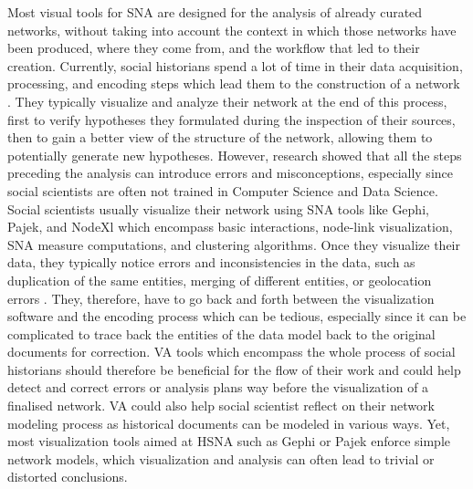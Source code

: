 Most visual tools for SNA are designed for the analysis of already curated networks, without taking into account the context in which those networks have been produced, where they come from, and the workflow that led to their creation.
Currently, social historians spend a lot of time in their data acquisition, processing, and encoding steps which lead them to the construction of a network \cite{lemercierBackSourcesPracticing2021}.
They typically visualize and analyze their network at the end of this process, first to verify hypotheses they formulated during the inspection of their sources, then to gain a better view of the structure of the network, allowing them to potentially generate new hypotheses\cite{dufournaudCommentRendreVisible2018}.
However, research showed that all the steps preceding the analysis can introduce errors and misconceptions, especially since social scientists are often not trained in Computer Science and Data Science\cite{lemercier12FormalNetwork2015, alkadi2022}.
Social scientists usually visualize their network using SNA tools like Gephi\cite{Gephi}, Pajek\cite{pajek}, and NodeXl\cite{noauthor_nodexl_nodate} which encompass basic interactions, node-link visualization, SNA measure computations, and clustering algorithms.
Once they visualize their data, they typically notice errors and inconsistencies in the data, such as duplication of the same entities, merging of different entities, or geolocation errors \cite{alkadi2022}.
They, therefore, have to go back and forth between the visualization software and the encoding process which can be tedious, especially since it can be complicated to trace back the entities of the data model back to the original documents for correction.
VA tools which encompass the whole process of social historians should therefore be beneficial for the flow of their work and could help detect and correct errors or analysis plans way before the visualization of a finalised network.
VA could also help social scientist reflect on their network modeling process as historical documents can be modeled in various ways\cite{cristofoliAuxSourcesGrands2008}.
Yet, most visualization tools aimed at HSNA such as Gephi\cite{Gephi} or Pajek\cite{pajek} enforce simple network models, which visualization and analysis can often lead to trivial or distorted conclusions\cite{lemercier12FormalNetwork2015}.
